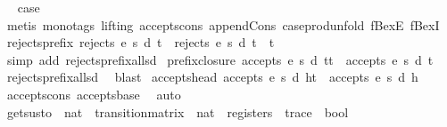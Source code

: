 \begin{isabellebody}
\ \isamarkupfalse%
\ {\isacharquery}case\isanewline
\ \ \ \ \isamarkupfalse%
\ {\isacharparenleft}metis\ {\isacharparenleft}mono{\isacharunderscore}tags{\isacharcomma}\ lifting{\isacharparenright}\ accepts{\isacharunderscore}cons\ append{\isacharunderscore}Cons\ case{\isacharunderscore}prod{\isacharunderscore}unfold\ fBexE\ fBexI{\isacharparenright}\isanewline
{}\isamarkupfalse%
%
\endisatagproof
{\isafoldproof}%
%
\isadelimproof
\isanewline
%
\endisadelimproof
\isanewline
{}\isamarkupfalse%
\ rejects{\isacharunderscore}prefix{\isacharcolon}\ {\isachardoublequoteopen}rejects\ e\ s\ d\ t\ {\isasymLongrightarrow}\ rejects\ e\ s\ d\ {\isacharparenleft}t\ {\isacharat}\ t{\isacharprime}{\isacharparenright}{\isachardoublequoteclose}\isanewline
%
\isadelimproof
\ \ %
\endisadelimproof
%
\isatagproof
{}\isamarkupfalse%
\ {\isacharparenleft}simp\ add{\isacharcolon}\ rejects{\isacharunderscore}prefix{\isacharunderscore}all{\isacharunderscore}s{\isacharunderscore}d{\isacharparenright}%
\endisatagproof
{\isafoldproof}%
%
\isadelimproof
\isanewline
%
\endisadelimproof
\isanewline
{}\isamarkupfalse%
\ prefix{\isacharunderscore}closure{\isacharcolon}\ {\isachardoublequoteopen}accepts\ e\ s\ d\ {\isacharparenleft}t{\isacharat}t{\isacharprime}{\isacharparenright}\ {\isasymLongrightarrow}\ accepts\ e\ s\ d\ t{\isachardoublequoteclose}\isanewline
%
\isadelimproof
\ \ %
\endisadelimproof
%
\isatagproof
{}\isamarkupfalse%
\ rejects{\isacharunderscore}prefix{\isacharunderscore}all{\isacharunderscore}s{\isacharunderscore}d\ \isamarkupfalse%
\ blast%
\endisatagproof
{\isafoldproof}%
%
\isadelimproof
\isanewline
%
\endisadelimproof
\isanewline
{}\isamarkupfalse%
\ accepts{\isacharunderscore}head{\isacharcolon}\ {\isachardoublequoteopen}accepts\ e\ s\ d\ {\isacharparenleft}h{\isacharhash}t{\isacharparenright}\ {\isasymLongrightarrow}\ accepts\ e\ s\ d\ {\isacharbrackleft}h{\isacharbrackright}{\isachardoublequoteclose}\isanewline
%
\isadelimproof
\ \ %
\endisadelimproof
%
\isatagproof
{}\isamarkupfalse%
\ accepts{\isacharunderscore}cons\ accepts{\isachardot}base\ \isamarkupfalse%
\ auto%
\endisatagproof
{\isafoldproof}%
%
\isadelimproof
\isanewline
%
\endisadelimproof
\isanewline
{}\isamarkupfalse%
\ gets{\isacharunderscore}us{\isacharunderscore}to\ {\isacharcolon}{\isacharcolon}\ {\isachardoublequoteopen}nat\ {\isasymRightarrow}\ transition{\isacharunderscore}matrix\ {\isasymRightarrow}\ nat\ {\isasymRightarrow}\ registers\ {\isasymRightarrow}\ trace\ {\isasymRightarrow}\ bool{\isachardoublequoteclose}\ \isanewline

\end{isabellebody}
